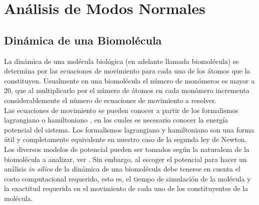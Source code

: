 \chapter{An\'{a}lisis de Modos Normales}\label{ch:2}

\section{Din\'{a}mica de una Biomol\'{e}cula}

La din\'{a}mica de una mol\'{e}cula biol\'{o}gica (en adelante llamada biomol\'{e}cula) se determina por las ecuaciones de movimiento para cada uno de los \'{a}tomos que la constituyen. Usualmente en una biomol\'{e}cula el n\'{u}mero de mon\'{o}meros es mayor a 20, que al multiplicarlo por el n\'{u}mero de \'{a}tomos en cada mon\'{o}mero incrementa considerablemente el n\'{u}mero de ecuaciones de movimiento a resolver.\\


Las ecuaciones de movimiento se pueden conocer a partir de los formalismos lagrangiano o hamiltoniano \cite{Goldstein2001}, en los cuales es necesario conocer la  energ\'{i}a potencial del sistema. Los formalismos lagrangiano y hamiltoniano son una forma \'{u}til y completamente equivalente en nuestro caso de la segunda ley de Newton.\\

Los diversos modelos de potencial pueden ser tomados seg\'{u}n la naturaleza de la biomol\'{e}cula a analizar, ver \cite{Lezon2009}. Sin embargo, al escoger el potencial  para hacer un an\'{a}lisis \textit{in silico} de la din\'{a}mica de una biomol\'{e}cula debe tenerse en cuenta el costo computacional requerido, esto es, el tiempo de simulaci\'{o}n de la mol\'{e}cula y la exactitud requerida en el movimiento de cada uno de los constituyentes de la mol\'{e}cula.\\
 
